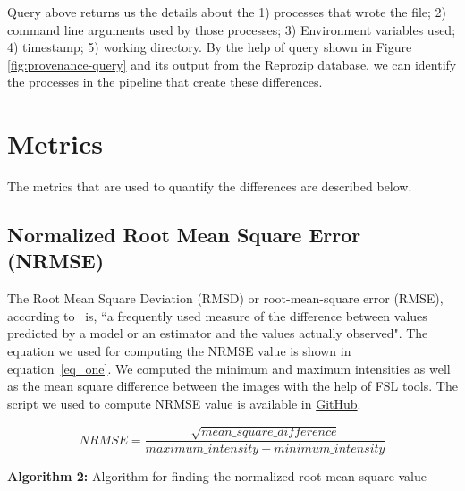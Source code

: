 Query above returns us the details about the 1) processes that wrote the file; 2) command line arguments used by those processes; 3) Environment variables used; 4) timestamp; 5) working directory. By the help of query shown in Figure \ref{fig:provenance-query} and its output from the Reprozip database, we can identify the processes in the pipeline that create these differences.

\section{Metrics} \label{sec:num1}
The metrics that are used to quantify the differences are described below.

\subsection{Normalized Root Mean Square Error (NRMSE)}
The Root Mean Square Deviation (RMSD) or root-mean-square error (RMSE), according to~\cite{khosrow2017handbook} is, ``a frequently used measure of the difference between values predicted by a model or an estimator and the values actually observed". The equation we used for computing the NRMSE value is shown in equation~\ref{eq_one}. We computed the minimum and maximum intensities as well as the mean square difference between the images with the help of FSL tools. The script we used to compute NRMSE value is available in \href{https://github.com/lalet/repro-tools/blob/master/metrics/nrmse.sh}{GitHub}.

\begin{equation}
  \label{eq_one}
    NRMSE = \frac{\sqrt{mean\_square\_difference}}{maximum\_intensity - minimum\_intensity}
\end{equation}

\iffalse
\hrulefill
\caption*{\textbf{Algorithm 2:} Algorithm for finding the normalized root mean square value}
\label{alg:algorithm_diff}
\hrulefill

